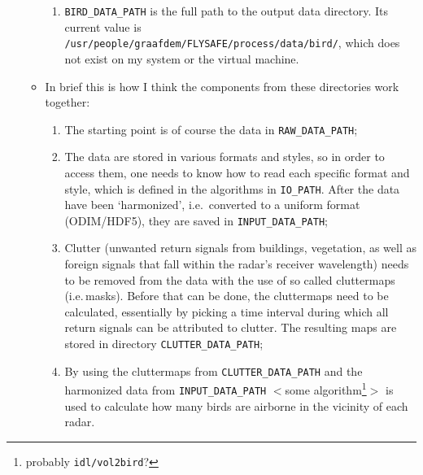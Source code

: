 \begin{enumerate}
\begin{itemize}
\begin{enumerate}
\item{\texttt{BIRD\_DATA\_PATH} is the full path to the output data directory. Its current value is \texttt{/usr/people/graafdem/FLYSAFE/process/data/bird/}, which does not exist on my system or the virtual machine.}
\end{enumerate}
\item[]{In brief this is how I think the components from these directories work together:}
\begin{enumerate}
\item{The starting point is of course the data in \texttt{RAW\_DATA\_PATH};}
\item{The data are stored in various formats and styles, so in order to access them, one needs to know how to read each specific format and style, which is defined in the algorithms in \texttt{IO\_PATH}. After the data have been `harmonized', i.e.\, converted to a uniform format (ODIM/HDF5), they are saved in \texttt{INPUT\_DATA\_PATH};}
\item{Clutter (unwanted return signals from buildings, vegetation, as well as foreign signals that fall within the radar's receiver wavelength) needs to be removed from the data with the use of so called cluttermaps (i.e.\,masks). Before that can be done, the cluttermaps need to be calculated, essentially by picking a time interval during which all return signals can be attributed to clutter. The resulting maps are stored in directory \texttt{CLUTTER\_DATA\_PATH};}
\item{By using the cluttermaps from \texttt{CLUTTER\_DATA\_PATH} and the harmonized data from \texttt{INPUT\_DATA\_PATH} $<$some algorithm\footnote{probably \texttt{idl/vol2bird}?}$>$ is used to calculate how many birds are airborne in the vicinity of each radar.}
\end{enumerate}


\end{itemize}
\end{enumerate}
